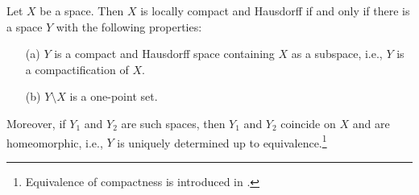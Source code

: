 \begin{thm}
    Let $X$ be a space.
    Then $X$ is locally compact and Hausdorff if and only if there is a space $Y$ with the following properties:
    \begin{enumerate}
        \item[(a)]
        {
            $Y$ is a compact and Hausdorff space containing $X$ as a subspace, i.e., $Y$ is a compactification of $X$.
        }
        \item[(b)]
        {
            $Y\setminus X$ is a one-point set.
        }
    \end{enumerate}
    Moreover, if $Y_1$ and $Y_2$ are such spaces, then $Y_1$ and $Y_2$ coincide on $X$ and are homeomorphic, i.e., $Y$ is uniquely determined up to equivalence.\footnote{Equivalence of compactness is introduced in .}
\end{thm}
